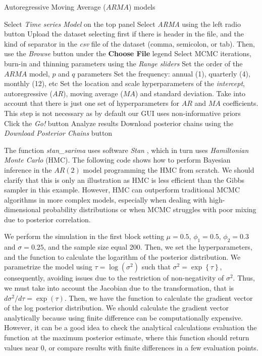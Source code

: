 \begin{algorithm}[h!]
	\caption{Autoregressive Moving Average ($ARMA$) models}\label{alg:ARMA}
	\begin{algorithmic}[1]  		 			
		\State Select \textit{Time series Model} on the top panel
		\State Select \textit{ARMA} using the left radio button
		\State Upload the dataset selecting first if there is header in the file, and the kind of separator in the \textit{csv} file of the dataset (comma, semicolon, or tab). Then, use the \textit{Browse} button under the \textbf{Choose File} legend
		\State Select MCMC iterations, burn-in and thinning parameters using the \textit{Range sliders}
		\State Set the order of the $ARMA$ model, $p$ and $q$ parameters
		\State Set the frequency: annual (1), quarterly (4), monthly (12), etc
		\State Set the location and scale hyperparameters of the \textit{intercept}, autoregressive ($AR$), moving average ($MA$) and standard deviation. Take into account that there is just one set of hyperparameters for $AR$ and $MA$ coefficients. This step is not necessary as by default our GUI uses non-informative priors
		\State Click the \textit{Go!} button
		\State Analyze results
		\State Download posterior chains using the \textit{Download Posterior Chains} button
	\end{algorithmic} 
\end{algorithm}

The function \textit{stan\_sarima} uses software \textit{Stan} \cite{Stan2024}, which in turn uses \textit{Hamiltonian Monte Carlo} (HMC). The following code shows how to perform Bayesian inference in the $AR(2)$ model programming the HMC from scratch. We should clarify that this is only an illustration as HMC is less efficient than the Gibbs sampler in this example. However, HMC can outperform traditional MCMC algorithms in more complex models, especially when dealing with high-dimensional probability distributions or when MCMC struggles with poor mixing due to posterior correlation.

We perform the simulation in the first block setting $\mu=0.5$, $\phi_1=0.5$, $\phi_2=0.3$ and $\sigma=0.25$, and the sample size equal 200. Then, we set the hyperparameters, and the function to calculate the logarithm of the posterior distribution. We parametrize the model using $\tau = \log(\sigma^2)$ such that $\sigma^2=\exp\left\{\tau\right\}$, consequently, avoiding issues due to the restriction of non-negativity of $\sigma^2$. Thus, we must take into account the Jacobian due to the transformation, that is $d\sigma^2/d\tau=\exp(\tau)$. Then, we have the function to calculate the gradient vector of the log posterior distribution. We should calculate the gradient vector analytically because using finite difference can be computationally expensive. However, it can be a good idea to check the analytical calculations evaluation the function at the maximum posterior estimate, where this function should return values near 0, or compare results with finite differences in a few evaluation points.

